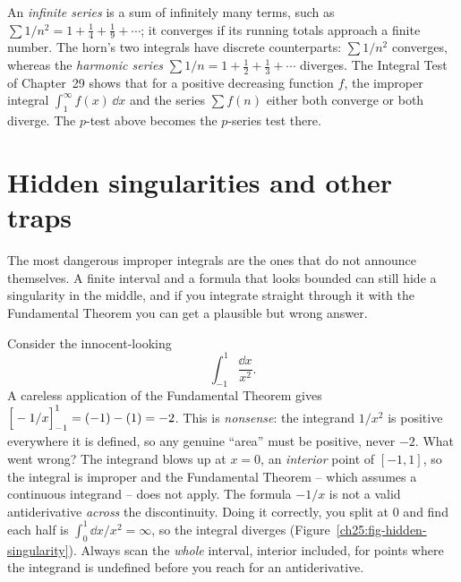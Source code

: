 \begin{connectionbox}
An \emph{infinite series} is a sum of infinitely many terms, such as
$\sum 1/n^2 = 1 + \tfrac14 + \tfrac19 + \cdots$; it converges if its running totals
approach a finite number. The horn's two integrals have discrete counterparts:
$\sum 1/n^2$ converges, whereas the \emph{harmonic series}
$\sum 1/n = 1 + \tfrac12 + \tfrac13 + \cdots$ diverges. The Integral Test of
Chapter~29 shows that for a positive decreasing function $f$, the improper
integral $\int_1^\infty f(x)\,\dd x$ and the series $\sum f(n)$ either both
converge or both diverge. The $p$-test above becomes the $p$-series test there.
\end{connectionbox}

\section{Hidden singularities and other traps}
\label{ch25:hidden}

The most dangerous improper integrals are the ones that do not announce themselves.
A finite interval and a formula that looks bounded can still hide a singularity in
the middle, and if you integrate straight through it with the Fundamental Theorem
you can get a plausible but wrong answer.

\begin{trapbox}
Consider the innocent-looking
\[
  \int_{-1}^{1} \frac{\dd x}{x^2}.
\]
A careless application of the Fundamental Theorem gives
$\Big[-1/x\Big]_{-1}^{1} = (-1) - (1) = -2$. This is \emph{nonsense}: the integrand
$1/x^2$ is positive everywhere it is defined, so any genuine ``area'' must be
positive, never $-2$. What went wrong? The integrand blows up at $x=0$, an
\emph{interior} point of $[-1,1]$, so the integral is improper and the
Fundamental Theorem -- which assumes a continuous integrand -- does not apply. The
formula $-1/x$ is not a valid antiderivative \emph{across} the discontinuity. Doing
it correctly, you split at $0$ and find each half is $\int_0^1 \dd x/x^2 = \infty$,
so the integral diverges (Figure~\ref{ch25:fig-hidden-singularity}). Always scan
the \emph{whole} interval, interior included, for points where the integrand is
undefined before you reach for an antiderivative.
\end{trapbox}

